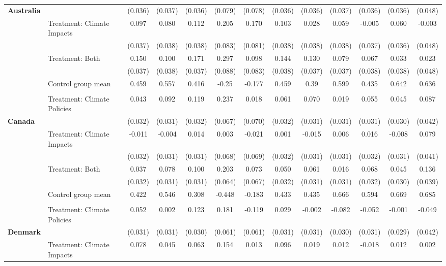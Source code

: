 \begin{tabular}[t]{llccccccccccc}
\textbf{Australia} &  & (0.036) & (0.037) & (0.036) & (0.079) & (0.078) & (0.036) & (0.036) & (0.037) & (0.036) & (0.036) & (0.048)\\
 & Treatment: Climate Impacts & 0.097 & 0.080 & 0.112 & 0.205 & 0.170 & 0.103 & 0.028 & 0.059 & -0.005 & 0.060 & -0.003\\
 &  & (0.037) & (0.038) & (0.038) & (0.083) & (0.081) & (0.038) & (0.038) & (0.038) & (0.037) & (0.036) & (0.048)\\
 & Treatment: Both & 0.150 & 0.100 & 0.171 & 0.297 & 0.098 & 0.144 & 0.130 & 0.079 & 0.067 & 0.033 & 0.023\\
 &  & (0.037) & (0.038) & (0.037) & (0.088) & (0.083) & (0.038) & (0.037) & (0.037) & (0.038) & (0.038) & (0.048)\\
\midrule
 & Control group mean & 0.459 & 0.557 & 0.416 & -0.25 & -0.177 & 0.459 & 0.39 & 0.599 & 0.435 & 0.642 & 0.636\\
 &  &  &  &  &  &  &  &  &  &  &  & \\
 & Treatment: Climate Policies & 0.043 & 0.092 & 0.119 & 0.237 & 0.018 & 0.061 & 0.070 & 0.019 & 0.055 & 0.045 & 0.087\\
\textbf{Canada} &  & (0.032) & (0.031) & (0.032) & (0.067) & (0.070) & (0.032) & (0.031) & (0.031) & (0.031) & (0.030) & (0.042)\\
 & Treatment: Climate Impacts & -0.011 & -0.004 & 0.014 & 0.003 & -0.021 & 0.001 & -0.015 & 0.006 & 0.016 & -0.008 & 0.079\\
 &  & (0.032) & (0.031) & (0.031) & (0.068) & (0.069) & (0.032) & (0.031) & (0.031) & (0.032) & (0.031) & (0.041)\\
 & Treatment: Both & 0.037 & 0.078 & 0.100 & 0.203 & 0.073 & 0.050 & 0.061 & 0.016 & 0.068 & 0.045 & 0.136\\
 &  & (0.032) & (0.031) & (0.031) & (0.064) & (0.067) & (0.032) & (0.031) & (0.031) & (0.032) & (0.030) & (0.039)\\
\midrule
 & Control group mean & 0.422 & 0.546 & 0.308 & -0.448 & -0.183 & 0.433 & 0.435 & 0.666 & 0.594 & 0.669 & 0.685\\
 &  &  &  &  &  &  &  &  &  &  &  & \\
 & Treatment: Climate Policies & 0.052 & 0.002 & 0.123 & 0.181 & -0.119 & 0.029 & -0.002 & -0.082 & -0.052 & -0.001 & -0.049\\
\textbf{Denmark} &  & (0.031) & (0.031) & (0.030) & (0.061) & (0.061) & (0.031) & (0.031) & (0.030) & (0.031) & (0.029) & (0.042)\\
 & Treatment: Climate Impacts & 0.078 & 0.045 & 0.063 & 0.154 & 0.013 & 0.096 & 0.019 & 0.012 & -0.018 & 0.012 & 0.002\\

\end{tabular}
